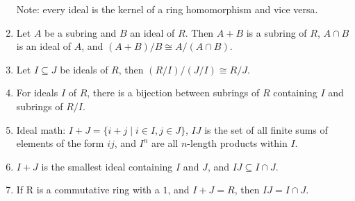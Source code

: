 \documentclass{article}
\begin{document}
\begin{enumerate}[1.]
        Note: every ideal is the kernel of a ring homomorphism and vice
        versa.
    \item Let $A$ be a subring and $B$ an ideal of $R$. Then $A + B$ is a
        subring of $R$, $A \cap B$ is an ideal of $A$, and $(A+B)/B \cong
        A/(A \cap B)$.
    \item Let $I \subseteq J$ be ideals of $R$, then $(R/I)/(J/I) \cong
        R/J$.
    \item For ideals $I$ of $R$, there is a bijection between subrings of
        $R$ containing $I$ and subrings of $R/I$.
    \item Ideal math: $I+J = \{i+j \mid i \in I, j \in J\}$, $IJ$ is the set
        of all finite sums of elements of the form $ij$, and $I^n$ are all
        $n$-length products within $I$.
    \item $I+J$ is the smallest ideal containing $I$ and $J$, and $IJ 
        \subseteq I \cap J$.
    \item If R is a commutative ring with a $1$, and $I+J = R$, then $IJ =
        I \cap J$.
\end{enumerate}
\end{document}

